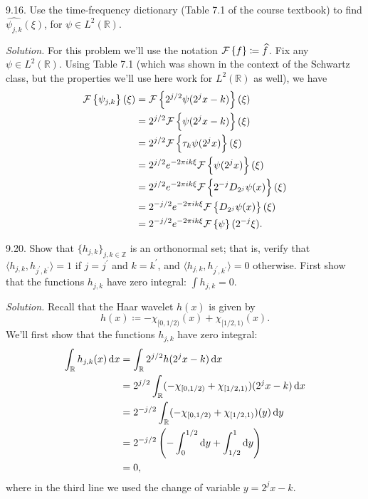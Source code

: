 \documentclass{article}
\newcommand{\R}{\mathbb{R}}
\newcommand{\Z}{\mathbb{Z}}
\newcommand{\F}{\mathcal{F}}
\begin{document}
9.16. Use the time-frequency dictionary (Table 7.1 of the course textbook)
to find $\widehat{\psi_{j,k}}(\xi)$, for $\psi \in L^2(\R)$.

\textit{Solution.}
For this problem we'll use the notation $\F \cbr{f} \coloneqq \widehat{f}$. Fix
any $\psi \in L^2(\R)$. Using Table 7.1 (which was shown in the context
of the Schwartz class, but the properties we'll use here work for
$L^2(\R)$ as well), we have
%
\begin{align*}
    \F \cbr{\psi_{j,k}}(\xi)
        &= \F \cbr{2^{j / 2} \psi(2^jx - k)}(\xi) \\
        &= 2^{j / 2} \F \cbr{\psi(2^jx - k)}(\xi) \\
        &= 2^{j / 2} \F \cbr{\tau_k \psi(2^jx)}(\xi) \\
        &= 2^{j / 2} e^{- 2 \pi i k \xi} \F \cbr{\psi(2^jx)}(\xi) \\
        &= 2^{j / 2} e^{- 2 \pi i k \xi} \F \cbr{2^{-j} D_{2^j} \psi(x)}(\xi) \\
        &= 2^{- j / 2} e^{- 2 \pi i k \xi} \F \cbr{D_{2^j} \psi(x)}(\xi) \\
        &= 2^{- j / 2} e^{- 2 \pi i k \xi} \F \cbr{\psi}(2^{-j} \xi)
        .
\end{align*}

\newpage

9.20. Show that $\{h_{j,k}\}_{j,k \in \Z}$ is an orthonormal set; that is,
verify that $\langle h_{j,k}, h_{j^\prime,k^\prime} \rangle = 1$ if
$j = j^\prime$ and $k = k^\prime$, and
$\langle h_{j,k}, h_{j^\prime,k^\prime} \rangle = 0$ otherwise. First show that
the functions $h_{j,k}$ have zero integral: $\int h_{j,k} = 0$.

\textit{Solution.}
Recall that the Haar wavelet $h(x)$ is given by
%
\begin{equation}
    h(x) \coloneqq - \chi_{[0, 1/2)}(x) + \chi_{[1/2, 1)}(x)
    \label{eq:920-mother}
    .
\end{equation}
%
We'll first show that the functions $h_{j,k}$ have zero integral:
%
\begin{align*}
    \int_{\R} h_{j,k}(x) \dif x
        &= \int_{\R} 2^{j / 2} h(2^j x - k) \dif x \\
        &= 2^{j / 2} \int_{\R} (- \chi_{[0, 1/2)} + \chi_{[1/2, 1)}) (2^j x - k) \dif x \\
        &= 2^{- j / 2} \int_{\R} (- \chi_{[0, 1/2)} + \chi_{[1/2, 1)}) (y) \dif y \\
        &= 2^{- j / 2} \del{- \int_0^{1/2} \dif y + \int_{1/2}^1 \dif y} \\
        &= 0
        ,
\end{align*}
%
where in the third line we used the change of variable $y = 2^j x - k$.
\end{document}

